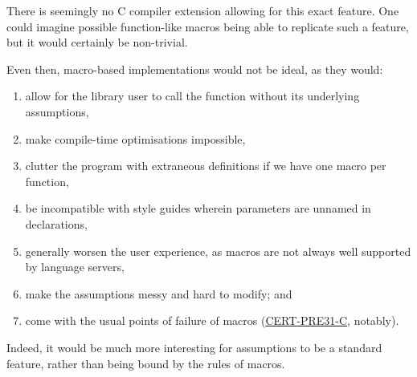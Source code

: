 \documentclass[a4paper, 12pt]{article}
\begin{document}
There is seemingly no C compiler extension allowing for this exact feature.  One
could imagine possible function-like macros being able to replicate such a
feature, but it would certainly be non-trivial.

Even then, macro-based implementations would not be ideal, as they would:
\begin{enumerate}
\item allow for the library user to call the function without its underlying assumptions,
\item make compile-time optimisations impossible,
\item clutter the program with extraneous definitions if we have one macro per function,
\item be incompatible with style guides wherein parameters are unnamed in declarations,
\item generally worsen the user experience, as macros are not always well supported
by language servers,
\item make the assumptions messy and hard to modify; and
\item come with the usual points of failure of macros (\href{https://wiki.sei.cmu.edu/confluence/display/c/PRE31-C.+Avoid+side+effects+in+arguments+to+unsafe+macros}{CERT-PRE31-C}, notably).
\end{enumerate}

Indeed, it would be much more interesting for assumptions to be a standard feature,
rather than being bound by the rules of macros.
\end{document}
